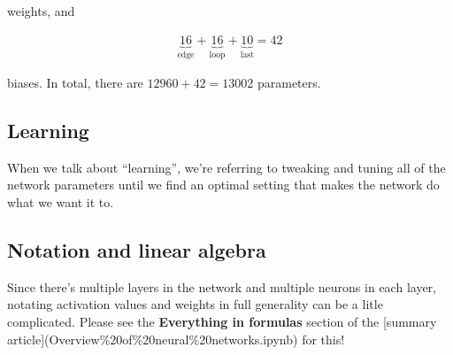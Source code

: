 \documentclass{article}
\begin{document}
	weights, and
	
	\begin{align*}
		\underbrace{16}_{\text{edge}} + \underbrace{16}_{\text{loop}} + \underbrace{10}_{\text{last}} = 42
	\end{align*}
	
	biases. In total, there are $12960 + 42 = 13002$ parameters.
	
	\subsection*{Learning}
	
	When we talk about ``learning'', we're referring to tweaking and tuning all of the network parameters until we find an optimal setting that makes the network do what we want it to.
	
	\subsection*{Notation and linear algebra}
	
	Since there's multiple layers in the network and multiple neurons in each layer, notating activation values and weights in full generality can be a litle complicated. Please see the \textbf{Everything in formulas} section of the [summary article](Overview\%20of\%20neural\%20networks.ipynb) for this!
\end{document}
